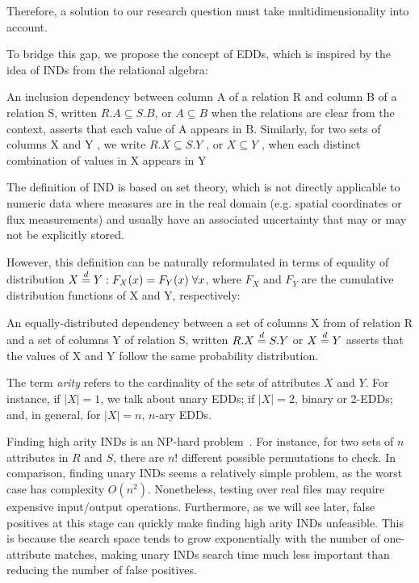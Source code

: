 Therefore, a solution to our research question must take multidimensionality into account.

To bridge this gap, we propose the concept of \glspl{EDD}, which is inspired by the idea of
\glspl{IND} from the relational algebra:

\begin{displayquote}
An inclusion dependency between column A of a relation
R and column B of a relation S, written $R.A \subseteq S.B$, or $A \subseteq B$
when the relations are clear from the context, asserts that each
value of A appears in B. Similarly, for two sets of columns X
and Y , we write $R.X \subseteq S.Y$ , or $X \subseteq Y$ , when each distinct
combination of values in X appears in Y \cite{abedjan2015}
\end{displayquote}

The definition of \gls{IND} is based on set theory, which is not directly applicable to
numeric data where measures are in the real domain (e.g. spatial coordinates
or flux measurements) and usually
have an associated uncertainty that may or may not be explicitly stored.

However, this definition can be naturally reformulated in terms of
equality of distribution $X \stackrel{d}{=} Y: F_X(x) = F_Y(x) \; \forall x$, where $F_X$ and
$F_Y$ are the cumulative distribution functions of X and Y, respectively:

\begin{definition}
An equally-distributed dependency between a set of columns X from
of relation R and a set of columns Y of relation S, written $R.X \stackrel{d}{=} S.Y$ or
$X \stackrel{d}{=} Y$ asserts that the values of X and Y follow the same probability distribution.
\label{def:eqdist}
\end{definition}

The term \emph{arity} refers to the cardinality of the sets of attributes $X$ and $Y$. For instance, if $|X| = 1$, we talk about unary \glspl{EDD}; if $|X| = 2$,
binary or 2-\glspl{EDD}; and, in general, for $|X| = n$, $n$-ary \glspl{EDD}.

Finding high arity \glspl{IND} is an NP-hard problem~\cite{kantola1992}.
For instance, for two sets of $n$ attributes in $R$ and $S$,
there are $n!$ different possible permutations to check.
In comparison, finding unary \glspl{IND} seems a relatively simple problem,
as the worst case has complexity $O(n^2)$. Nonetheless,
testing over real files may require expensive input/output operations.
Furthermore, as we will see later, false positives at this stage can quickly make
finding high arity \glspl{IND} unfeasible. This is because the search space tends to grow exponentially
with the number of one-attribute matches, making unary \glspl{IND} search time much less important
than reducing the number of false positives.

